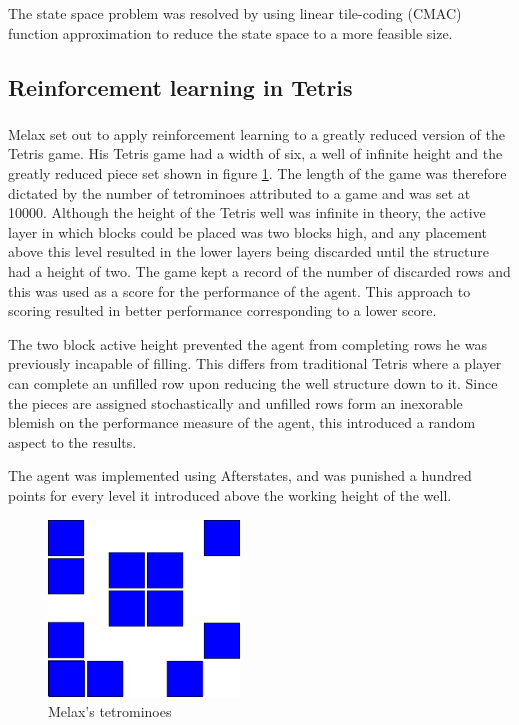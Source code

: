 \documentclass{rucsthesis}
\begin{document}
The state space problem was resolved by using linear tile-coding (CMAC) function approximation to reduce the state space to a more feasible size\citep{keepaway}.

\subsection{Reinforcement learning in Tetris}

\subsubsection{\cite{melaxtetris}}

Melax set out to apply reinforcement learning to a greatly reduced version of the Tetris game. His Tetris game had a width of six, a well of infinite height and the greatly reduced piece set shown in figure \ref{fig:melaxpieces}. The length of the game was therefore dictated by the number of tetrominoes attributed to a game and was set at 10000. Although the height of the Tetris well was infinite in theory, the active layer in which blocks could be placed was two blocks high, and any placement above this level resulted in the lower layers being discarded until the structure had a height of two. The game kept a record of the number of discarded rows and this was used as a score for the performance of the agent. This approach to scoring resulted in better performance corresponding to a lower score. 

The two block active height prevented the agent from completing rows he was previously incapable of filling. This differs from traditional Tetris where a player can complete an unfilled row upon reducing the well structure down to it. Since the pieces are assigned stochastically and unfilled rows form an inexorable blemish on the performance measure of the agent, this introduced a random aspect to the results.

The agent was implemented using Afterstates, and was punished a hundred points for every level it introduced above the working height of the well.

\begin{figure}[h]
\centering
\includegraphics[width=2in]{reducedblocks.png}
\caption{Melax's tetrominoes}
\label{fig:melaxpieces}
\end{figure}
\end{document}
